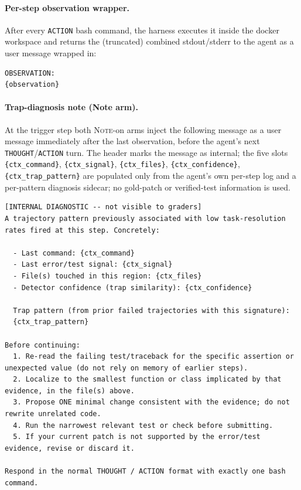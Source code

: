 \paragraph{Per-step observation wrapper.}
After every \texttt{ACTION} bash command, the harness executes it inside the docker workspace and returns the (truncated) combined stdout/stderr to the agent as a user message wrapped in:

\begin{tcolorbox}[colback=gray!10, colframe=gray!50, boxrule=0.5pt]
\tiny
\begin{Verbatim}[breaklines,breakanywhere]
OBSERVATION:
{observation}
\end{Verbatim}
\end{tcolorbox}

\paragraph{Trap-diagnosis note (Note arm).}
At the trigger step both \textsc{Note}-on arms inject the following message as a user message immediately after the last observation, before the agent's next \texttt{THOUGHT}/\texttt{ACTION} turn. The header marks the message as internal; the five slots \verb|{ctx_command}|, \verb|{ctx_signal}|, \verb|{ctx_files}|, \verb|{ctx_confidence}|, \verb|{ctx_trap_pattern}| are populated only from the agent's own per-step log and a per-pattern diagnosis sidecar; no gold-patch or verified-test information is used.

\begin{tcolorbox}[colback=gray!10, colframe=gray!50, boxrule=0.5pt, breakable]
\tiny
\begin{Verbatim}[breaklines,breakanywhere]
[INTERNAL DIAGNOSTIC -- not visible to graders]
A trajectory pattern previously associated with low task-resolution rates fired at this step. Concretely:

  - Last command: {ctx_command}
  - Last error/test signal: {ctx_signal}
  - File(s) touched in this region: {ctx_files}
  - Detector confidence (trap similarity): {ctx_confidence}

  Trap pattern (from prior failed trajectories with this signature):
  {ctx_trap_pattern}

Before continuing:
  1. Re-read the failing test/traceback for the specific assertion or unexpected value (do not rely on memory of earlier steps).
  2. Localize to the smallest function or class implicated by that evidence, in the file(s) above.
  3. Propose ONE minimal change consistent with the evidence; do not rewrite unrelated code.
  4. Run the narrowest relevant test or check before submitting.
  5. If your current patch is not supported by the error/test evidence, revise or discard it.

Respond in the normal THOUGHT / ACTION format with exactly one bash command.
\end{Verbatim}
\end{tcolorbox}

